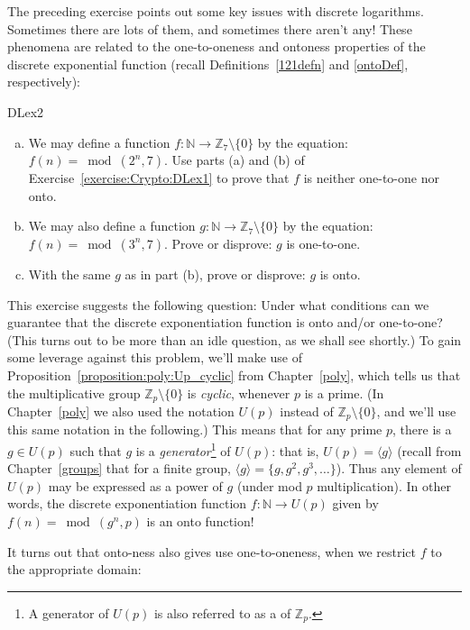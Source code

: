 The preceding exercise points out some key issues with discrete logarithms. Sometimes there are lots of them, and sometimes there aren't any! These phenomena are related to the one-to-oneness and ontoness properties of  the discrete exponential function (recall Definitions~\ref{121defn} and \ref{ontoDef}, respectively):

\begin{exercise}{DLex2}
\begin{enumerate}[(a)]
\item
We may define a function $f: \mathbb{N} \rightarrow \mathbb{Z}_7 \setminus \{0\}$ by the equation: $f(n) = \bmod(2^n,7)$. 
Use parts (a) and (b) of Exercise~\ref{exercise:Crypto:DLex1} to prove that $f$ is neither one-to-one nor onto.
\item
We may also define a function $g: \mathbb{N} \rightarrow \mathbb{Z}_7 \setminus \{0\}$ by the equation: $f(n) = \bmod(3^n,7)$. 
Prove or disprove: $g$ is one-to-one.
\item
With the same $g$ as in part (b), prove or disprove: $g$ is onto.
\end{enumerate}
\end{exercise}

This exercise suggests the following question:  Under what conditions can we guarantee that the discrete exponentiation function is onto and/or one-to-one? (This turns out to be more than an idle question, as we shall see shortly.)  To gain some leverage against this problem, we'll make use of   Proposition~\ref{proposition:poly:Up_cyclic} from Chapter~\ref{poly}, which tells us that the multiplicative group $\mathbb{Z}_p\setminus \{0\}$ is \emph{cyclic}, whenever $p$ is a prime. (In Chapter~\ref{poly} we also used the notation $U(p)$ instead of $\mathbb{Z}_p\setminus \{0\}$, and we'll use this same notation in the following.) This means that for any prime $p$, there is a $g \in U(p)$  such that $g$ is a \emph{generator}\footnote{A generator of $U(p)$ is also referred to as a  of $\mathbb{Z}_p$.} of  $U(p)$: that is, $U(p) = \langle g \rangle$ (recall from Chapter~\ref{groups} that for a finite group, $\langle g \rangle = \{g, g^2, g^3, \ldots \}$). 
Thus any element of $U(p)$ may be expressed as a power of $g$ (under mod $p$ multiplication).  In other words, the discrete exponentiation function $f: \mathbb{N} \rightarrow U(p)$ given by $f(n) = \bmod(g^n,p)$ is an onto function!  

It turns out that onto-ness also gives use one-to-oneness, when we restrict $f$ to the appropriate domain:

